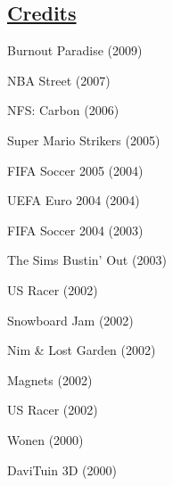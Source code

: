 \documentclass[margin, line, 11pt]{resume}
\newenvironment{list2}{
	\begin{list}{\small{\ding{110}}}{%
      \setlength{\itemsep}{0in}
      \setlength{\parsep}{0in} \setlength{\parskip}{0in}
      \setlength{\topsep}{0in} \setlength{\partopsep}{0in}
      \setlength{\leftmargin}{0.2in}}}{\end{list}}
\begin{document}
\begin{resume}
\section{\sc \href{http://www.mobygames.com/developer/sheet/view/developerId,94489/}{Credits}}
\begin{multicols}{3}
\begin{list2}
    \item Burnout Paradise (2009)
    \item NBA Street (2007)
    \item NFS: Carbon (2006)    
    \item Super Mario Strikers (2005)
    \item FIFA Soccer 2005 (2004)
    \item UEFA Euro 2004 (2004)
    \item FIFA Soccer 2004 (2003)
    \item The Sims Bustin' Out (2003)
    \item US Racer (2002)
    \item Snowboard Jam (2002)
    \item Nim \& Lost Garden (2002)
    \item Magnets (2002)
    \item US Racer (2002)
    \item Wonen (2000)
    \item DaviTuin 3D (2000)    
\end{list2}
\end{multicols}

\end{resume}
\end{document}
